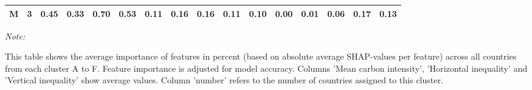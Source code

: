 \begin{table}[H]
{\begin{threeparttable}
\begin{tabular}[t]{lrrrrrrrrrrrrrrr}
M & 3 & 0.45 & 0.33 & 0.70 & 0.53 & 0.11 & 0.16 & 0.16 & 0.11 & 0.10 & 0.00 & 0.01 & 0.06 & 0.17 & 0.13\\
\bottomrule
\end{tabular}
\begin{tablenotes}
\item \textit{Note: } 
\item This table shows the average importance of features in percent (based on absolute average SHAP-values per feature) across all countries from each cluster A to F. Feature importance is adjusted for model accuracy. Columns 'Mean carbon intensity', 'Horizontal inequality' and 'Vertical inequality' show average values. Column 'number' refers to the number of countries assigned to this cluster.
\end{tablenotes}
\end{threeparttable}}
\end{table}
